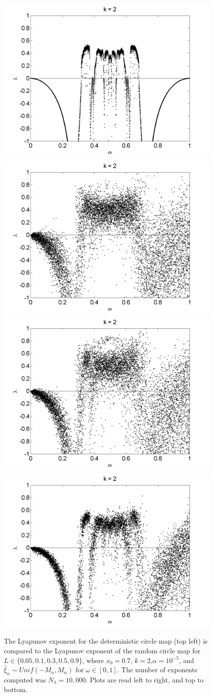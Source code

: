 \begin{figure}[!h]
\caption[Lyapunov exponent in the random circle map (uniform distribution) compared to the
deterministic map, varying $\omega$]{The Lyapunov exponent for the deterministic
  circle map (top left) is compared
  to the Lyapunov exponent of the random circle map for $L \in
  \{0.05,0.1,0.3,0.5,0.9\}$, where $x_0=0.7$, $k=2$,$\alpha =
  10^{-5}$, and $\hat{\xi}_n\sim
  Unif(-M_n,M_n)$ for $\omega \in [0,1]$. The number of exponents computed was $N_\lambda=10,000$. Plots are read left to right, and top to bottom. }\label{fig:rcirclyap_u}
\centering
\includegraphics[width=.5\textwidth]{figs/detcirc_lyap_10000_k_2_w.png}\hfill
\includegraphics[width=.5\textwidth]{figs/rcirc_u_lyap_10000_L_005_k_2_w.png}\\
\includegraphics[width=.5\textwidth]{figs/rcirc_u_lyap_10000_L_01_k_2_w.png}\hfill
\includegraphics[width=.5\textwidth]{figs/rcirc_u_lyap_10000_L_03_k_2_w.png}\\

\end{figure}
